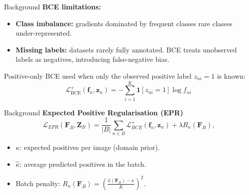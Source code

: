 
\begin{frame}{Background}
  \textbf{BCE limitations:}
\begin{itemize}
  \item \textbf{Class imbalance:} gradients dominated by frequent classes \textrightarrow{} rare classes under-represented.
  \item \textbf{Missing labels:} datasets rarely fully annotated. BCE treats unobserved labels as negatives, introducing false-negative bias.
\end{itemize}
  \vspace{0.5em}
  Positive-only BCE used when only the observed positive label $z_{ni}=1$ is known:
  \begin{equation*}
    \mathcal{L}_{\text{BCE}}^{+}(\mathbf{f}_n,\mathbf{z}_n) = - \sum_{i=1}^{K} \mathbf{1}[z_{ni}=1] \log f_{ni}
  \end{equation*}
\end{frame}

\begin{frame}{Background}
  \textbf{Expected Positive Regularisation (EPR)}
    \begin{equation*}
      \mathcal{L}_{EPR}(\mathbf{F}_B,\mathbf{Z}_B) = \frac{1}{|B|}\sum_{n\in B}\mathcal{L}_{BCE}^+(\mathbf{f}_n,\mathbf{z}_n)+\lambda R_\kappa(\mathbf{F}_B)\text{,}
    \end{equation*}
  \begin{itemize}
    \item $\kappa$: expected positives per image (domain prior).
    \item $\hat{\kappa}$: average predicted positives in the batch.
    \item Batch penalty: $    R_\kappa(\mathbf{F}_B) = \left(\frac{\hat{\kappa}(\mathbf{F}_B)-\kappa}{K}\right)^2$.
  \end{itemize}
\end{frame}


